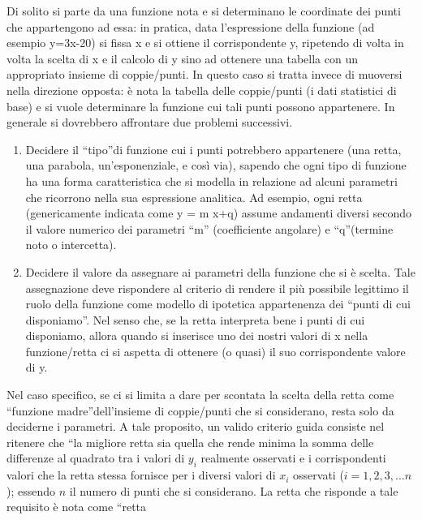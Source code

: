  Di solito si parte da una funzione nota e si determinano le coordinate dei 
punti che appartengono ad essa: in pratica, data l'espressione della 
funzione (ad esempio y=3x-20) si fissa x e si ottiene il corrispondente y, 
ripetendo di volta in volta la  scelta di x e il calcolo di y  sino ad 
ottenere una tabella con un  appropriato insieme di coppie/punti. 
 In questo caso si tratta invece di muoversi nella direzione opposta: è 
nota la tabella delle coppie/punti (i dati statistici di base) e si vuole 
determinare la funzione cui tali punti possono appartenere.
 In generale si dovrebbero affrontare due problemi successivi. 
 \begin{enumerate}
        \item Decidere il \textquotedblleft tipo\textquotedblright di 
funzione cui i punti potrebbero appartenere (una retta, una parabola, 
un'esponenziale, e così via), sapendo che ogni tipo di funzione ha una 
forma caratteristica che si modella in relazione ad alcuni parametri che 
ricorrono nella sua espressione analitica. Ad esempio, ogni retta 
(genericamente indicata come y = m x+q) assume andamenti diversi secondo il 
valore numerico dei parametri \textquotedblleft m\textquotedblright 
(coefficiente angolare) e \textquotedblleft q\textquotedblright (termine 
noto o intercetta).
        \item Decidere  il valore da assegnare ai parametri della funzione 
che si è scelta. Tale assegnazione deve rispondere al criterio di rendere 
il più possibile legittimo il ruolo della funzione come modello di 
ipotetica appartenenza dei \textquotedblleft punti di cui 
disponiamo\textquotedblright. Nel senso che, se la retta interpreta bene i 
punti di cui disponiamo, allora quando si inserisce uno dei nostri valori 
di x nella funzione/retta ci si aspetta di ottenere (o quasi) il suo 
corrispondente valore di y.
 \end{enumerate}
 Nel caso specifico, se ci si limita a dare per scontata la scelta della 
retta come \textquotedblleft funzione madre\textquotedblright dell'insieme 
di coppie/punti che si considerano, resta solo da deciderne i parametri. A 
tale proposito, un valido criterio guida consiste nel ritenere che 
\textquotedblleft la migliore retta sia quella che rende minima la somma 
delle differenze al quadrato tra i valori di $y_i$ realmente osservati e i 
corrispondenti valori che la retta stessa fornisce per i diversi valori di 
$x_i$ osservati ($i=1,2,3,\dots n$); essendo $n$ il numero di punti che si 
considerano.
 La retta che risponde a tale requisito è nota come \textquotedblleft retta 
